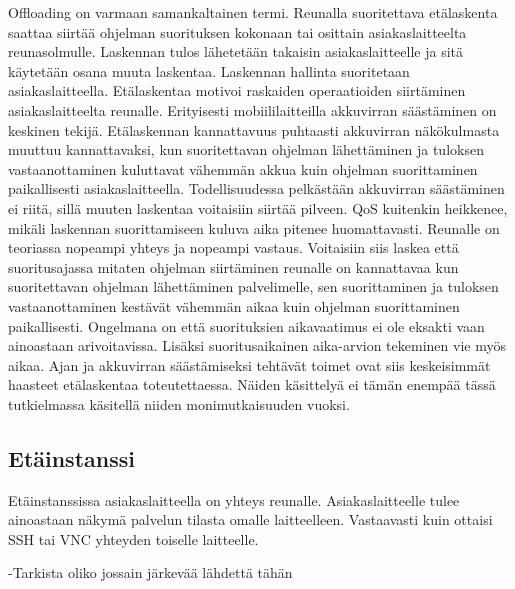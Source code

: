 \documentclass[finnish]{tktltiki2}
\theoremstyle{definition}
\theoremstyle{remark}
\begin{document}
Offloading on varmaan samankaltainen termi.
Reunalla suoritettava etälaskenta saattaa siirtää ohjelman suorituksen kokonaan tai osittain asiakaslaitteelta reunasolmulle. Laskennan tulos lähetetään takaisin asiakaslaitteelle ja sitä käytetään osana muuta laskentaa. 
Laskennan hallinta suoritetaan asiakaslaitteella. Etälaskentaa motivoi raskaiden operaatioiden siirtäminen asiakaslaitteelta reunalle. Erityisesti mobiililaitteilla akkuvirran säästäminen on keskinen tekijä. Etälaskennan kannattavuus puhtaasti akkuvirran näkökulmasta muuttuu kannattavaksi, kun suoritettavan ohjelman lähettäminen ja tuloksen vastaanottaminen kuluttavat vähemmän akkua kuin ohjelman suorittaminen paikallisesti asiakaslaitteella.
Todellisuudessa pelkästään akkuvirran säästäminen ei riitä, sillä muuten laskentaa voitaisiin siirtää pilveen. QoS kuitenkin heikkenee, mikäli laskennan suorittamiseen kuluva aika pitenee huomattavasti.
Reunalle on teoriassa nopeampi yhteys ja nopeampi vastaus. Voitaisiin siis laskea että suoritusajassa mitaten ohjelman siirtäminen reunalle on kannattavaa kun suoritettavan ohjelman lähettäminen palvelimelle, sen suorittaminen ja tuloksen vastaanottaminen kestävät vähemmän aikaa kuin ohjelman suorittaminen paikallisesti. 
Ongelmana on että suorituksien aikavaatimus ei ole eksakti vaan ainoastaan arivoitavissa. Lisäksi suoritusaikainen aika-arvion tekeminen vie myös aikaa. 
Ajan ja akkuvirran säästämiseksi tehtävät toimet ovat siis keskeisimmät haasteet etälaskentaa toteutettaessa. Näiden käsittelyä ei tämän enempää tässä tutkielmassa käsitellä niiden monimutkaisuuden vuoksi.


\subsection{Etäinstanssi}
Etäinstanssissa asiakaslaitteella on yhteys reunalle. Asiakaslaitteelle tulee ainoastaan näkymä palvelun tilasta omalle laitteelleen. Vastaavasti kuin ottaisi SSH tai VNC yhteyden toiselle laitteelle. 

-Tarkista oliko jossain järkevää lähdettä tähän
\end{document}
